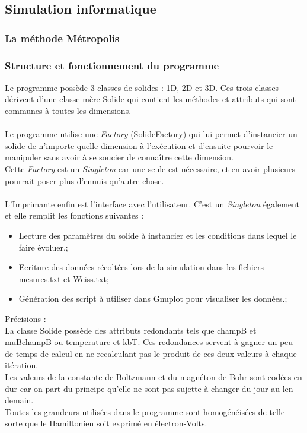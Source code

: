 \subsection{Simulation informatique}

\subsubsection{La méthode Métropolis}

\subsubsection{Structure et fonctionnement du programme}


Le programme possède 3 classes de solides : 1D, 2D et 3D. Ces trois classes dérivent d'une classe mère Solide qui contient les méthodes et attributs qui sont communes à toutes les dimensions.\\
\\
Le programme utilise une \emph{Factory} (SolideFactory) qui lui permet d'instancier un solide de n'importe-quelle dimension à l’exécution et d'ensuite pourvoir le manipuler sans avoir à se soucier de connaître cette dimension.\\
Cette \emph{Factory} est un \emph{Singleton} car une seule est nécessaire, et en avoir plusieurs pourrait poser plus d'ennuis qu'autre-chose.\\
\\
L'Imprimante enfin est l'interface avec l'utilisateur. C'est un \emph{Singleton} également et elle remplit les fonctions suivantes :\\
\begin{itemize}
\item Lecture des paramètres du solide à instancier et les conditions dans lequel le faire évoluer.;
\item Ecriture des données récoltées lors de la simulation dans les fichiers mesures.txt et Weiss.txt;
\item Génération des script à utiliser dans Gnuplot pour visualiser les données.;
\end{itemize}
\vspace{\parskip} %

Précisions :\\
La classe Solide possède des attributs redondants tels que champB et muBchampB ou temperature et kbT. Ces redondances servent à gagner un peu de temps de calcul en ne recalculant pas le produit de ces deux valeurs à chaque itération.\\
Les valeurs de la constante de Boltzmann et du magnéton de Bohr sont codées en dur car on part du principe qu'elle ne sont pas sujette à changer du jour au len-demain.\\
Toutes les grandeurs utilisées dans le programme sont homogénéisées de telle sorte que le Hamiltonien soit exprimé en électron-Volts.

